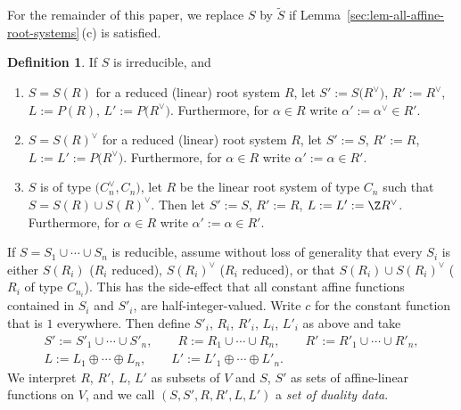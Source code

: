 \documentclass[10pt,a4paper]{amsart}
\theoremstyle{definition}
\newtheorem{Definition}[Theorem]{Definition}
\numberwithin{equation}{section}
\begin{document}
For the remainder of this paper, we replace $S$ by $\tilde{S}$ if Lemma~\ref{sec:lem-all-affine-root-systems}\,(c) is satisfied.

\begin{Definition}
 If $S$ is irreducible, and
 \begin{enumerate}\itemsep=0pt
 \item[(i)] $S=S(R)$ for a reduced (linear) root system $R$, let
$
 S':= S\bigl(R^\vee\bigr)$, $ R':= R^\vee$, $ L:= P(R)$, $ L':= P\bigl(R^\vee\bigr)$.
 Furthermore, for $\alpha\in R$ write
 $\alpha':=\alpha^\vee\in R'$.
 \item[(ii)] $S=S(R)^\vee$ for a reduced (linear) root system $R$, let
$
 S':= S$, $ R':= R$, $ L:=L':=P\bigl(R^\vee\bigr)$.
 Furthermore, for $\alpha\in R$ write
 $\alpha':=\alpha\in R'$.
 \item[(iii)] $S$ is of type $\bigl(C_n^\vee, C_n\bigr)$, let $R$ be the linear root system of
 type $C_n$ such that $S=S(R)\cup S(R)^\vee$. Then let
$
 S':= S$, $ R':= R$, $ L:=L':= \Z R^\vee$.
 Furthermore, for $\alpha\in R$ write
 $\alpha':=\alpha\in R'$.
 \end{enumerate}
 If $S=S_1\cup\cdots\cup S_n$ is reducible, assume without loss of generality that
 every $S_i$ is either $S(R_i)$ ($R_i$ reduced), $S(R_i)^\vee$ ($R_i$ reduced), or
 that $S(R_i)\cup S(R_i)^\vee$ ($R_i$ of type $C_{n_i}$). This has the side-effect that all
 constant affine functions contained in $S_i$ and $S'_i$, are half-integer-valued. Write
 $c$ for the constant function that is $1$ everywhere.
 Then define $S'_i$, $R_i$, $R'_i$, $L_i$, $L'_i$ as above and take
 \begin{gather*}
 S':= S'_1\cup\cdots\cup S'_n,\qquad
 R:= R_1\cup\cdots\cup R_n,\qquad
 R':= R'_1\cup\cdots\cup R'_n,\\
 L:= L_1\oplus\cdots\oplus L_n,\qquad
 L':= L'_1\oplus\cdots\oplus L'_n.
 \end{gather*}
 We interpret $R$, $R'$, $L$, $L'$ as subsets of $V$ and $S$, $S'$ as sets of
 affine-linear functions on $V$, and we call
 $(S,S',R,R',L,L')$ a \emph{set of duality data}.
\end{Definition}
\end{document}
